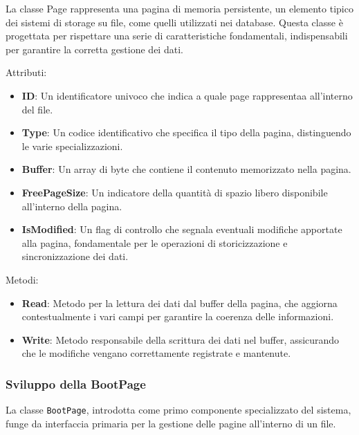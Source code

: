 \documentclass[12pt,a4paper,openright,twoside]{book}
\begin{document}
                

                La classe Page rappresenta una pagina di memoria persistente, un elemento tipico dei sistemi di storage su file, come quelli utilizzati nei database. Questa classe è progettata per rispettare una serie di caratteristiche fondamentali, indispensabili per garantire la corretta gestione dei dati.

                Attributi:
                \begin{itemize}
                    \item \textbf{ID}: Un identificatore univoco che indica a quale page rappresentaa all'interno del file.
                    \item \textbf{Type}: Un codice identificativo che specifica il tipo della pagina, distinguendo le varie specializzazioni.
                    \item \textbf{Buffer}: Un array di byte che contiene il contenuto memorizzato nella pagina.
                    \item \textbf{FreePageSize}: Un indicatore della quantità di spazio libero disponibile all'interno della pagina.
                    \item \textbf{IsModified}: Un flag di controllo che segnala eventuali modifiche apportate alla pagina, fondamentale per le operazioni di storicizzazione e sincronizzazione dei dati.
                \end{itemize}

                Metodi:
                \begin{itemize}
                    \item \textbf{Read}: Metodo per la lettura dei dati dal buffer della pagina, che aggiorna contestualmente i vari campi per garantire la coerenza delle informazioni.
                    \item \textbf{Write}: Metodo responsabile della scrittura dei dati nel buffer, assicurando che le modifiche vengano correttamente registrate e mantenute.
                \end{itemize}

            \subsubsection{Sviluppo della BootPage}

                La classe \texttt{BootPage}, introdotta come primo componente specializzato del sistema, funge da interfaccia primaria per la gestione delle pagine all’interno di un file.
\end{document}
